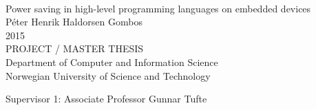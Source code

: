 
\thispagestyle{empty}
\mbox{}\\[6pc]
\begin{center}
\Huge{Power saving in high-level programming languages on embedded devices}\\[2pc]

\Large{Péter Henrik Haldorsen Gombos}\\[1pc]
\large{2015}\\[2pc]

PROJECT / MASTER THESIS\\
Department of Computer and Information Science\\
Norwegian University of Science and Technology
\end{center}
\vfill

\noindent Supervisor 1: Associate Professor Gunnar Tufte 


